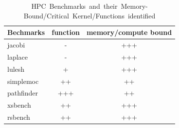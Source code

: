 %
%
\begin{table}[t!]
\small
\caption{\mbox{HPC Benchmarks and their Memory-Bound/Critical Kernel/Functions identified}}
\centering
    \begin{tabularx}{7.2cm}{lcc}
\toprule
    Bechmarks & function & memory/compute bound \\
\midrule
jacobi & - & +++ \\
laplace  & - & +++ \\
lulesh & + & +++ \\
simplemoc & ++ & ++ \\
pathfinder   & +++ & ++ \\
xsbench      & ++ & +++ \\
rsbench      & ++ & +++ \\
\bottomrule
   \end{tabularx}
\label{table:compare}
\end{table}
%
%
%









